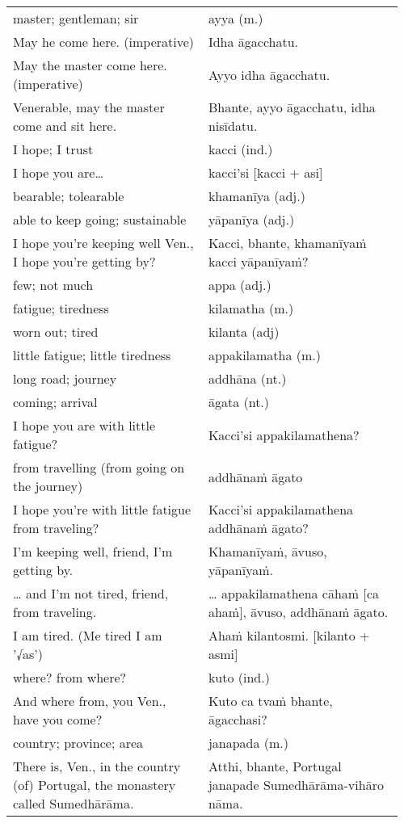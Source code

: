 \documentclass[a5paper]{memoir}
\begin{document}
\begin{longtable}{L{0.48\linewidth} L{0.48\linewidth}}
master; gentleman; sir & ayya (m.)\\[0pt]
May he come here. (imperative) & Idha āgacchatu.\\[0pt]
May the master come here. (imperative) & Ayyo idha āgacchatu.\\[0pt]
Venerable, may the master come and sit here. & Bhante, ayyo āgacchatu, idha nisīdatu.\\[0pt]
I hope; I trust & kacci (ind.)\\[0pt]
I hope you are\ldots{} & kacci'si [kacci + asi]\\[0pt]
bearable; tolearable & khamanīya (adj.)\\[0pt]
able to keep going; sustainable & yāpanīya (adj.)\\[0pt]
I hope you're keeping well Ven., I hope you're getting by? & Kacci, bhante, khamanīyaṁ kacci yāpanīyaṁ?\\[0pt]
few; not much & appa (adj.)\\[0pt]
fatigue; tiredness & kilamatha (m.)\\[0pt]
worn out; tired & kilanta (adj)\\[0pt]
little fatigue; little tiredness & appakilamatha (m.)\\[0pt]
long road; journey & addhāna (nt.)\\[0pt]
coming; arrival & āgata (nt.)\\[0pt]
I hope you are with little fatigue? & Kacci'si appakilamathena?\\[0pt]
from travelling (from going on the journey) & addhānaṁ āgato\\[0pt]
I hope you're with little fatigue from traveling? & Kacci'si appakilamathena addhānaṁ āgato?\\[0pt]
I'm keeping well, friend, I'm getting by. & Khamanīyaṁ, āvuso, yāpanīyaṁ.\\[0pt]
\ldots{} and I'm not tired, friend, from traveling. & \ldots{} appakilamathena cāhaṁ [ca ahaṁ], āvuso, addhānaṁ āgato.\\[0pt]
I am tired. (Me tired I am '√as') & Ahaṁ kilantosmi. [kilanto + asmi]\\[0pt]
where? from where? & kuto (ind.)\\[0pt]
And where from, you Ven., have you come? & Kuto ca tvaṁ bhante, āgacchasi?\\[0pt]
country; province; area & janapada (m.)\\[0pt]
There is, Ven., in the country (of) Portugal, the monastery called Sumedhārāma. & Atthi, bhante, Portugal janapade Sumedhārāma-vihāro nāma.\\[0pt]

\end{longtable}
\end{document}
